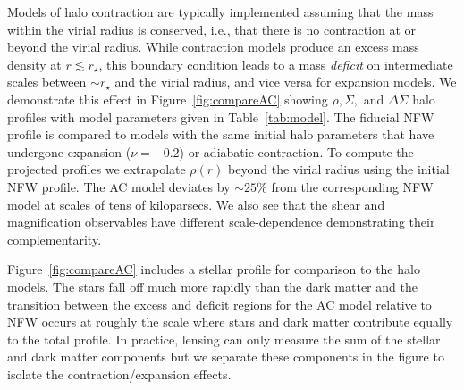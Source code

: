 \documentclass[12pt]{emulateapj}
\begin{document}
Models of halo contraction are typically implemented
assuming that the mass within the virial radius is conserved, i.e.,
that there is no contraction at or beyond the virial radius. While
contraction models produce an excess mass density at $r \lesssim
r_{\star}$, this boundary condition leads to a mass \textit{deficit} on
intermediate scales between $\sim r_{\star}$ and the virial radius, and vice
versa for expansion models. We demonstrate this effect in
Figure~\ref{fig:compareAC} showing $\rho, \Sigma,$ and $\Delta\Sigma$
halo profiles with model parameters given in
Table~\ref{tab:model}. The fiducial NFW profile is compared to models
with the same initial halo 
parameters that have undergone expansion ($\nu=-0.2$) or adiabatic
contraction. To compute the projected profiles we extrapolate
$\rho(r)$ beyond the virial radius using the initial NFW profile. The AC model deviates
by $\sim25\%$ from the corresponding NFW model at scales of tens of
kiloparsecs. We also see that the shear and magnification observables have
different scale-dependence demonstrating their complementarity.

\begin{figure*}[htb]
\caption{Density ($\rho(r)$; left), magnification ($\Sigma(R)$;
  center), and shear ($\Delta\Sigma(R)$; right) profiles for different halo models showing the
  effects of baryonic contraction or expansion relative to NFW. A
  Hernquist profile for the stellar component is included for
  comparison. Stellar and NFW model parameters are from Table~\ref{tab:model}. The AC model uses
  $\nu=1$ while the Expansion model has $\nu=-0.2$. The boundary
  condition specifying no contraction at the virial radius leads to a
  deficit (excess) in the AC (Expansion) profiles relative to NFW at
  $r_{\star}\lesssim r\lesssim r_{\rm vir}$.}
\label{fig:compareAC}
\end{figure*}

Figure~\ref{fig:compareAC} includes a stellar profile for comparison
to the halo models. The stars fall off much more rapidly
than the dark matter and the transition between the excess and
deficit regions for the AC model relative to NFW occurs at roughly the scale
where stars and dark matter contribute equally to the total
profile. In practice, lensing can only measure the sum of the stellar
and dark matter components but we separate these components in the
figure to isolate the contraction/expansion effects. 
\end{document}
